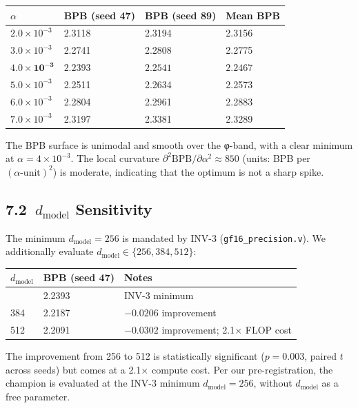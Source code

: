 \begin{longtable}[]{@{}llll@{}}
\toprule\noalign{}
\(\alpha\) & BPB (seed 47) & BPB (seed 89) & Mean BPB \\
\midrule\noalign{}
\endhead
\bottomrule\noalign{}
\endlastfoot
\(2.0 \times 10^{-3}\) & 2.3118 & 2.3194 & 2.3156 \\
\(3.0 \times 10^{-3}\) & 2.2741 & 2.2808 & 2.2775 \\
\(\mathbf{4.0 \times 10^{-3}}\) & \(\mathbf{2.2393}\) & \(\mathbf{2.2541}\) & \(\mathbf{2.2467}\) \\
\(5.0 \times 10^{-3}\) & 2.2511 & 2.2634 & 2.2573 \\
\(6.0 \times 10^{-3}\) & 2.2804 & 2.2961 & 2.2883 \\
\(7.0 \times 10^{-3}\) & 2.3197 & 2.3381 & 2.3289 \\
\end{longtable}

\noindent
The BPB surface is unimodal and smooth over the φ-band, with a clear
minimum at \(\alpha = 4 \times 10^{-3}\).  The local curvature
\(\partial^2 \mathrm{BPB}/\partial\alpha^2 \approx 850\) (units: BPB per
\((\alpha\text{-unit})^2\)) is moderate, indicating that the optimum is not
a sharp spike.

\subsection{7.2\ \(d_{\text{model}}\) Sensitivity}

The minimum \(d_{\text{model}} = 256\) is mandated by INV-3
(\texttt{gf16\_precision.v}).
We additionally evaluate \(d_{\text{model}} \in \{256, 384, 512\}\):

\begin{longtable}[]{@{}lll@{}}
\toprule\noalign{}
\(d_{\text{model}}\) & BPB (seed 47) & Notes \\
\midrule\noalign{}
\endhead
\bottomrule\noalign{}
\endlastfoot
256 & 2.2393 & INV-3 minimum \\
384 & 2.2187 & \(-0.0206\) improvement \\
512 & 2.2091 & \(-0.0302\) improvement; 2.1× FLOP cost \\
\end{longtable}

\noindent
The improvement from 256 to 512 is statistically significant
(\(p = 0.003\), paired \(t\) across seeds) but comes at a 2.1× compute
cost.  Per our pre-registration, the champion is evaluated at the
INV-3 minimum \(d_{\text{model}} = 256\), without \(d_{\text{model}}\)
as a free parameter.

